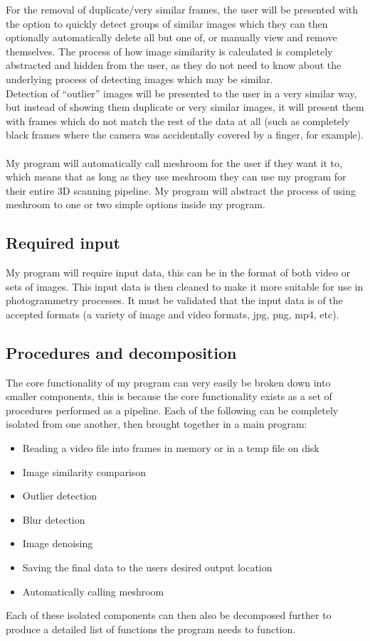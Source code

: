 \documentclass[11pt]{report}
\begin{document}
For the removal of duplicate/very similar frames, the user will be presented with the option to quickly detect groups of similar images which they can then optionally automatically delete all but one of, or manually view and remove themselves.
The process of how image similarity is calculated is completely abstracted and hidden from the user, as they do not need to know about the underlying process of detecting images which may be similar.\\
Detection of ``outlier'' images will be presented to the user in a very similar way, but instead of showing them duplicate or very similar images, it will present them with frames which do not match the rest of the data at all (such as completely black frames where the camera was accidentally covered by a finger, for example).\\\\
My program will automatically call meshroom for the user if they want it to, which means that as long as they use meshroom they can use my program for their entire 3D scanning pipeline. My program will abstract the process of using meshroom to one or two simple options inside my program.

\subsection{Required input}
My program will require input data, this can be in the format of both video or sets of images. This input data is then cleaned to make it more suitable for use in photogrammetry processes. It must be validated that the input data is of the accepted formats (a variety of image and video formats, jpg, png, mp4, etc).

\subsection{Procedures and decomposition}
The core functionality of my program can very easily be broken down into smaller components, this is because the core functionality exists as a set of procedures performed as a pipeline. Each of the following can be completely isolated from one another, then brought together in a main program:
\begin{itemize}
\item Reading a video file into frames in memory or in a temp file on disk
\item Image similarity comparison
\item Outlier detection
\item Blur detection
\item Image denoising
\item Saving the final data to the users desired output location
\item Automatically calling meshroom
\end{itemize}
Each of these isolated components can then also be decomposed further to produce a detailed list of functions the program needs to function.
\end{document}
